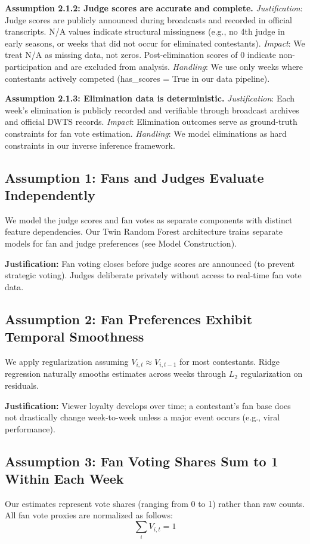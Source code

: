 \documentclass{mcmthesis}
\begin{document}
\textbf{Assumption 2.1.2: Judge scores are accurate and complete.}
\textit{Justification}: Judge scores are publicly announced during broadcasts and recorded in official transcripts. N/A values indicate structural missingness (e.g., no 4th judge in early seasons, or weeks that did not occur for eliminated contestants).
\textit{Impact}: We treat N/A as missing data, not zeros. Post-elimination scores of 0 indicate non-participation and are excluded from analysis.
\textit{Handling}: We use only weeks where contestants actively competed (has\_scores = True in our data pipeline).

\textbf{Assumption 2.1.3: Elimination data is deterministic.}
\textit{Justification}: Each week's elimination is publicly recorded and verifiable through broadcast archives and official DWTS records.
\textit{Impact}: Elimination outcomes serve as ground-truth constraints for fan vote estimation.
\textit{Handling}: We model eliminations as hard constraints in our inverse inference framework.
\fi


\subsection*{Assumption 1: Fans and Judges Evaluate Independently}
We model the judge scores and fan votes as separate components with distinct feature dependencies. Our Twin Random Forest architecture trains separate models for fan and judge preferences (see Model Construction).

\textbf{Justification:} Fan voting closes before judge scores are announced (to prevent strategic voting). Judges deliberate privately without access to real-time fan vote data.

\subsection*{Assumption 2: Fan Preferences Exhibit Temporal Smoothness}
We apply regularization assuming $V_{i,t} \approx V_{i,t-1}$ for most contestants. Ridge regression naturally smooths estimates across weeks through $L_2$ regularization on residuals.

\textbf{Justification:} Viewer loyalty develops over time; a contestant’s fan base does not drastically change week-to-week unless a major event occurs (e.g., viral performance).

\subsection*{Assumption 3: Fan Voting Shares Sum to 1 Within Each Week}
Our estimates represent vote shares (ranging from 0 to 1) rather than raw counts. All fan vote proxies are normalized as follows:
\begin{equation}
\sum_{i} V_{i,t} = 1 
\end{equation}
\end{document}
